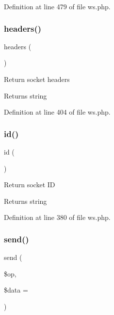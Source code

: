 Definition at line 479 of file ws.\+php.

\hypertarget{class_c_l_i_1_1_agent_acf17788084df5a3d3415f4d9e346471d}{}\label{class_c_l_i_1_1_agent_acf17788084df5a3d3415f4d9e346471d} 
\subsubsection{\texorpdfstring{headers()}{headers()}}
{\footnotesize\ttfamily headers (\begin{DoxyParamCaption}{ }\end{DoxyParamCaption})}

Return socket headers \begin{DoxyReturn}{Returns}
string 
\end{DoxyReturn}


Definition at line 404 of file ws.\+php.

\hypertarget{class_c_l_i_1_1_agent_a087060b582403885d08e89ad894ecc5d}{}\label{class_c_l_i_1_1_agent_a087060b582403885d08e89ad894ecc5d} 
\subsubsection{\texorpdfstring{id()}{id()}}
{\footnotesize\ttfamily id (\begin{DoxyParamCaption}{ }\end{DoxyParamCaption})}

Return socket ID \begin{DoxyReturn}{Returns}
string 
\end{DoxyReturn}


Definition at line 380 of file ws.\+php.

\hypertarget{class_c_l_i_1_1_agent_ac9dd53c0c506703aeabb74246830c2e9}{}\label{class_c_l_i_1_1_agent_ac9dd53c0c506703aeabb74246830c2e9} 
\subsubsection{\texorpdfstring{send()}{send()}}
{\footnotesize\ttfamily send (\begin{DoxyParamCaption}\item[{}]{\$op,  }\item[{}]{\$data = {\ttfamily \textquotesingle{}\textquotesingle{}} }\end{DoxyParamCaption})}

